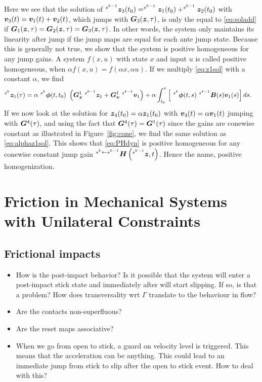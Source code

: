 \documentclass[DC2017114Bouma.tex]{subfiles}
\begin{document}
Here we see that the solution of $^{s^{k-1}}{\boldsymbol{z}}_3(t_0) = ^{s^{k-1}}{\boldsymbol{z}}_1(t_0) + ^{s^{k-1}}{\boldsymbol{z}}_2(t_0)$ with ${\boldsymbol{v}}_3(t) = {\boldsymbol{v}}_1(t) + {\boldsymbol{v}}_2(t)$, which jumps with ${\boldsymbol{G}}_3({\boldsymbol{z}},\tau)$, is only the equal to \eqref{eq:soladd} if ${\boldsymbol{G}}_1({\boldsymbol{z}},\tau) = {\boldsymbol{G}}_2({\boldsymbol{z}},\tau) = {\boldsymbol{G}}_3({\boldsymbol{z}},\tau)$. In other words, the system only maintains its linearity after jump if the jump maps are equal for each ante jump state. Because this is generally not true, we show that the system is positive homogeneous for any jump gains. A system $f(x,u)$ with state $x$ and input $u$ is called positive homogeneous, when $\alpha f(x,u) = f(\alpha x, \alpha u)$. If we multiply \eqref{eq:z1sol} with a constant $\alpha$, we find
\begin{align}
^{s^{k}}\zb_1(\tau) &= \alpha \ ^{s^{k}}\phib(t,t_0)\ \left(\Gb_\zb^1 \ ^{s^{k-1}}\zb_1 + \Gb_\vb^1\ ^{s^{k-1}}\vb_1\right) + \alpha\int_{t_0}^\tau \left[\ ^{s^{k}}\phib(t,s)\ ^{s^{k-1}}\Bb(s)\vb_1(s)\right]ds.\label{eq:alphaz1sol}
\end{align}
If we now look at the solution for ${\boldsymbol{z}}_4(t_0) = \alpha{\boldsymbol{z}}_1(t_0)$ with ${\boldsymbol{v}}_4(t) = \alpha{\boldsymbol{v}}_1(t)$ jumping with ${\boldsymbol{G}}^4(\tau)$, and using the fact that ${\boldsymbol{G}}^4(\tau) = {\boldsymbol{G}}^1(\tau)$ since the gains are conewise constant as illustrated in Figure~\ref{fig:cone}, we find the same solution as \eqref{eq:alphaz1sol}. This shows that \eqref{eq:PHdyn} is positive homogeneous for any conewise constant jump gain $^{s^{k}\leftarrow s^{k-1}}{\boldsymbol{H}}\left(^{s^{k-1}}{\boldsymbol{z}},t\right)$. Hence the name, positive homogenization. 

\section{Friction in Mechanical Systems with Unilateral Constraints}
\subsection{Frictional impacts}
\begin{itemize}
    \item How is the post-impact behavior? Is it possible that the system will enter a post-impact stick state and immediately after will start slipping. If so, is that a problem? How does transversality wrt $\Gamma$ translate to the behaviour in flow?
    \item Are the contacts non-superfluous?
	\item Are the reset maps associative?
    \item When we go from open to stick, a guard on velocity level is triggered. This means that the acceleration can be anything. This could lead to an immediate jump from stick to slip after the open to stick event. How to deal with this?
\end{itemize}
\end{document}
